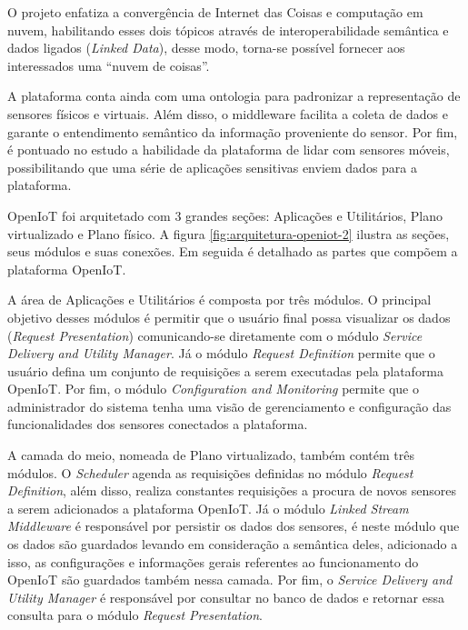 O projeto enfatiza a convergência de Internet das Coisas e computação em nuvem,
habilitando esses dois tópicos através de interoperabilidade semântica e dados
ligados (\textit{Linked Data}), desse modo, torna-se possível fornecer aos interessados
uma ``nuvem de coisas''.

A plataforma conta ainda com uma ontologia para padronizar a representação de
sensores físicos e virtuais. Além disso, o middleware facilita a coleta de
dados e garante o entendimento semântico da informação proveniente do sensor.
Por fim, é pontuado no estudo a habilidade da plataforma de lidar com sensores
móveis, possibilitando que uma série de aplicações sensitivas enviem dados para
a plataforma.

OpenIoT foi arquitetado com 3 grandes seções: Aplicações e Utilitários, Plano
virtualizado e Plano físico. A figura \ref{fig:arquitetura-openiot-2} ilustra as
seções, seus módulos e suas conexões. Em seguida é detalhado as partes que
compõem a plataforma OpenIoT.

    
A área de Aplicações e Utilitários é composta por três módulos. O principal
objetivo desses módulos é permitir que o usuário final possa visualizar os
dados (\textit{Request Presentation}) comunicando-se diretamente com o módulo
\textit{Service Delivery and Utility Manager}.  Já o módulo \textit{Request
Definition} permite que o usuário defina um conjunto de requisições a serem
executadas pela plataforma OpenIoT. Por fim, o módulo \textit{Configuration and
Monitoring} permite que o administrador do sistema tenha uma visão de
gerenciamento e configuração das funcionalidades dos sensores conectados a
plataforma. 

A camada do meio, nomeada de Plano virtualizado, também contém três módulos. O
\textit{Scheduler} agenda as requisições definidas no módulo \textit{Request
Definition}, além disso, realiza constantes requisições a procura de novos
sensores a serem adicionados a plataforma OpenIoT. Já o módulo \textit{Linked
Stream Middleware} é responsável por persistir os dados dos sensores, é neste
módulo que os dados são guardados levando em consideração a semântica deles,
adicionado a isso, as configurações e informações gerais referentes ao
funcionamento do OpenIoT são guardados também nessa camada. Por fim, o
\textit{Service Delivery and Utility Manager} é responsável por consultar no
banco de dados e retornar essa consulta para o módulo \textit{Request
Presentation}.

